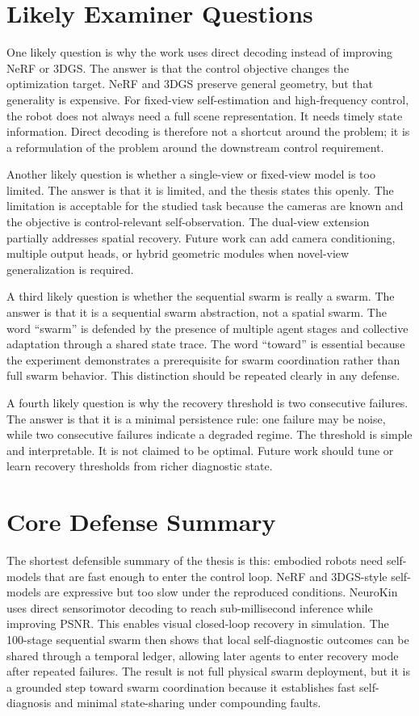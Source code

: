 \documentclass[12pt,a4paper,oneside]{report}
\begin{document}
\section{Likely Examiner Questions}

One likely question is why the work uses direct decoding instead of improving NeRF or 3DGS. The answer is that the control objective changes the optimization target. NeRF and 3DGS preserve general geometry, but that generality is expensive. For fixed-view self-estimation and high-frequency control, the robot does not always need a full scene representation. It needs timely state information. Direct decoding is therefore not a shortcut around the problem; it is a reformulation of the problem around the downstream control requirement.

Another likely question is whether a single-view or fixed-view model is too limited. The answer is that it is limited, and the thesis states this openly. The limitation is acceptable for the studied task because the cameras are known and the objective is control-relevant self-observation. The dual-view extension partially addresses spatial recovery. Future work can add camera conditioning, multiple output heads, or hybrid geometric modules when novel-view generalization is required.

A third likely question is whether the sequential swarm is really a swarm. The answer is that it is a sequential swarm abstraction, not a spatial swarm. The word ``swarm'' is defended by the presence of multiple agent stages and collective adaptation through a shared state trace. The word ``toward'' is essential because the experiment demonstrates a prerequisite for swarm coordination rather than full swarm behavior. This distinction should be repeated clearly in any defense.

A fourth likely question is why the recovery threshold is two consecutive failures. The answer is that it is a minimal persistence rule: one failure may be noise, while two consecutive failures indicate a degraded regime. The threshold is simple and interpretable. It is not claimed to be optimal. Future work should tune or learn recovery thresholds from richer diagnostic state.

\section{Core Defense Summary}

The shortest defensible summary of the thesis is this: embodied robots need self-models that are fast enough to enter the control loop. NeRF and 3DGS-style self-models are expressive but too slow under the reproduced conditions. NeuroKin uses direct sensorimotor decoding to reach sub-millisecond inference while improving PSNR. This enables visual closed-loop recovery in simulation. The 100-stage sequential swarm then shows that local self-diagnostic outcomes can be shared through a temporal ledger, allowing later agents to enter recovery mode after repeated failures. The result is not full physical swarm deployment, but it is a grounded step toward swarm coordination because it establishes fast self-diagnosis and minimal state-sharing under compounding faults.
\end{document}

